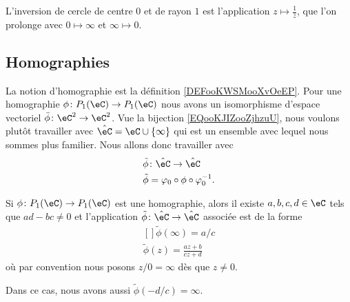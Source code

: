 \begin{example}
    L'inversion de cercle de centre \( 0\) et de rayon \( 1\) est l'application \( z\mapsto \frac{1}{ \bar z }\), que l'on prolonge avec \( 0\mapsto \infty\) et \( \infty\mapsto 0\).
\end{example}

\subsection{Homographies}

La notion d'homographie est la définition \ref{DEFooKWSMooXvOeEP}. Pour une homographie \( \phi\colon P_1(\eC)\to P_1(\eC)\) nous avons un isomorphisme d'espace vectoriel \( \bar\phi\colon \eC^2\to \eC^2\). Vue la bijection \eqref{EQooKJIZooZjhzuU}, nous voulons plutôt travailler avec \( \hat \eC=\eC\cup\{ \infty \}\) qui est un ensemble avec lequel nous sommes plus familier. Nous allons donc travailler avec
\begin{equation}
    \begin{aligned}
        \tilde \phi&\colon \hat \eC\to \hat \eC \\
        \tilde \phi&=\varphi_0\circ\phi\circ\varphi_0^{-1}.
    \end{aligned}
\end{equation}

\begin{proposition}     \label{PROPooTZJBooPpowOo}
    Si \( \phi\colon P_1(\eC)\to P_1(\eC)\) est une homographie, alors il existe \( a,b,c,d\in \eC\) tels que \( ad-bc\neq 0\) et l'application \( \tilde \phi\colon \hat \eC\to \hat \eC\) associée est de la forme
    \begin{equation}
        \begin{aligned}[]
            \tilde \phi(\infty)=a/c\\
            \tilde \phi(z)=\frac{ az+b }{ cz+d }
        \end{aligned}
    \end{equation}
    où par convention nous posons \( z/0=\infty\) dès que \( z\neq 0\).

    Dans ce cas, nous avons aussi \( \tilde \phi(-d/c)=\infty\).
\end{proposition}

